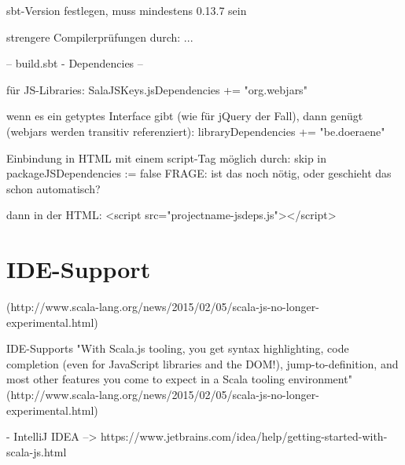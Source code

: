 \documentclass[a4paper, 12pt, hidelinks, listof=totoc, listoftables=totoc, bibliography=totoc]{scrreprt}
\begin{document}

sbt-Version festlegen, muss mindestens 0.13.7 sein


strengere Compilerprüfungen durch: ...


-- build.sbt - Dependencies --

für JS-Libraries:
SalaJSKeys.jsDependencies += "org.webjars" %

wenn es ein getyptes Interface gibt (wie für jQuery der Fall), dann genügt (webjars werden transitiv referenziert):
libraryDependencies += "be.doeraene" %

Einbindung in HTML mit einem script-Tag möglich durch:
skip in packageJSDependencies := false
FRAGE: ist das noch nötig, oder geschieht das schon automatisch?

dann in der HTML:
<script src="projectname-jsdeps.js"></script>



































\section{IDE-Support}
(http://www.scala-lang.org/news/2015/02/05/scala-js-no-longer-experimental.html)

IDE-Supports
  "With Scala.js tooling, you get syntax highlighting, code completion (even for JavaScript libraries and the DOM!), jump-to-definition, and most other features you come to expect in a Scala tooling environment" (http://www.scala-lang.org/news/2015/02/05/scala-js-no-longer-experimental.html)

  - IntelliJ IDEA  -->  https://www.jetbrains.com/idea/help/getting-started-with-scala-js.html
\end{document}
